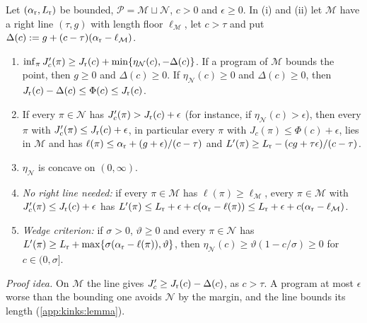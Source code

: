 \begin{lemma}\label{lem:kink:main}
Let $(\alpha_{\rm r},L_{\rm r})$ be bounded, $\mathcal P=\mathcal M\sqcup\mathcal N$, $c>0$ and $\epsilon\ge0$. In (i) and (ii) let $\mathcal M$ have a right line $(\tau,g)$ with length floor $\ell_{\mathcal M}$, let $c>\tau$ and put $\Delta(c):=g+(c-\tau)(\alpha_{\rm r}-\ell_{\mathcal M})$.
\begin{enumerate}[label=(\roman*),itemsep=0pt,topsep=2pt]
\item $\inf_\pi J'_c(\pi)\ge J_{\rm r}(c)+\min\{\eta_{\mathcal N}(c),-\Delta(c)\}$. If a program of $\mathcal M$ bounds the point, then $g\ge0$ and $\Delta(c)\ge0$. If $\eta_{\mathcal N}(c)\ge0$ and $\Delta(c)\ge0$, then $J_{\rm r}(c)-\Delta(c)\le\Phi(c)\le J_{\rm r}(c)$.
\item If every $\pi\in\mathcal N$ has $J'_c(\pi)>J_{\rm r}(c)+\epsilon$ (for instance, if $\eta_{\mathcal N}(c)>\epsilon$), then every $\pi$ with $J'_c(\pi)\le J_{\rm r}(c)+\epsilon$, in particular every $\pi$ with $J_c(\pi)\le\Phi(c)+\epsilon$, lies in $\mathcal M$ and has $\ell(\pi)\le\alpha_{\rm r}+(g+\epsilon)/(c-\tau)$ and $L'(\pi)\ge L_{\rm r}-(cg+\tau\epsilon)/(c-\tau)$.
\item $\eta_{\mathcal N}$ is concave on $(0,\infty)$.
\item \emph{No right line needed:} if every $\pi\in\mathcal M$ has $\ell(\pi)\ge\ell_{\mathcal M}$, every $\pi\in\mathcal M$ with $J'_c(\pi)\le J_{\rm r}(c)+\epsilon$ has $L'(\pi)\le L_{\rm r}+\epsilon+c(\alpha_{\rm r}-\ell(\pi))\le L_{\rm r}+\epsilon+c(\alpha_{\rm r}-\ell_{\mathcal M})$.
\item \emph{Wedge criterion:} if $\sigma>0$, $\vartheta\ge0$ and every $\pi\in\mathcal N$ has $L'(\pi)\ge L_{\rm r}+\max\{\sigma(\alpha_{\rm r}-\ell(\pi)),\vartheta\}$, then $\eta_{\mathcal N}(c)\ge\vartheta(1-c/\sigma)\ge0$ for $c\in(0,\sigma]$.
\end{enumerate}
\end{lemma}

\emph{Proof idea.} On $\mathcal M$ the line gives $J'_c\ge J_{\rm r}(c)-\Delta(c)$, as $c>\tau$. A program at most $\epsilon$ worse than the bounding one avoids $\mathcal N$ by the margin, and the line bounds its length (\cref{app:kinks:lemma}).

